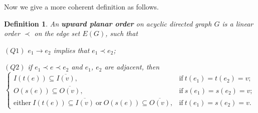\documentclass[11pt,a4paper]{article}
\newtheorem{defn}[thm]{Definition}
\begin{document}
Now we give a more coherent definition as follows.
\begin{defn}\label{upo1}
An \textbf{upward planar order} on acyclic directed graph $G$ is a linear order $\prec$ on the edge set $E(G)$, such that

$(Q1)$ $e_1\rightarrow e_2$ implies that $e_1\prec e_2$;

$(Q2)$ if $e_1\prec e\prec e_2$ and $e_1$, $e_2$ are adjacent, then
\begin{equation*}
\begin{cases}
I(t(e))\subseteq \overline{I(v)},&  \text{if}\ t(e_1)=t(e_2)=v;\\
O(s(e))\subseteq \overline{O(v)},&  \text{if}\ s(e_1)=s(e_2)=v;\\
\text{either}\ I(t(e))\subseteq \overline{I(v)}\  \text{or}\ O(s(e))\subseteq \overline{O(v)},&  \text{if}\ t(e_1)=s(e_2)=v.
\end{cases}
\end{equation*}
\end{defn}
\end{document}
